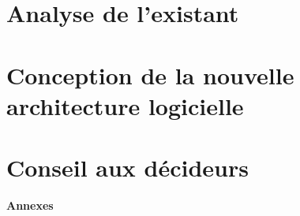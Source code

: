\documentclass[11pt,a4paper,oneside]{report}
\begin{document}
\small





\tableofcontents

\chapter{Analyse de l'existant}
\label{chap:analyse}






\chapter{Conception de la nouvelle architecture logicielle}
\label{chap:conception}









\chapter{Conseil aux décideurs}
\label{chap:conseil}






\clearpage
\appendix
{}
{}
{\Large\bfseries\color{cnNavy} Annexes\par}
\vspace{8pt}




{\footnotesize
\printbibliography[heading=bibintoc, title={R\'{e}f\'{e}rences}]
}
\end{document}
